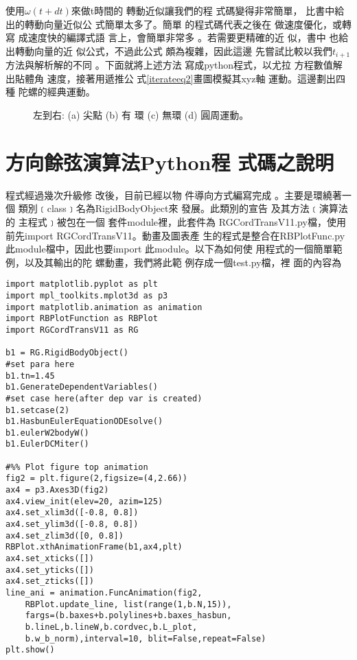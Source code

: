 \documentclass[12pt,twoside]{article}
\begin{document}
使用$\omega (t+dt)$來做t時間的%
轉動近似讓我們的程%
式碼變得非常簡單，%
比書中\cite[Page 301, Equation 10.24]{titterton}給%
出的轉動向量近似公%
式簡單太多了。簡單%
的程式碼代表之後在%
做速度優化，或轉寫%
成速度快的編譯式語%
言上，會簡單非常多%
。若需要更精確的近%
似，書\cite[Page 301, Equation 10.24]{titterton}中%
也給出轉動向量的近%
似公式，不過此公式%
頗為複雜，因此這邊%
先嘗試比較以我們$t_{i+1}$%
方法與解析解的不同%
。下面就將上述方法%
寫成python程式，以尤拉%
方程數值解出貼體角%
速度，接著用遞推公%
式\ref{iterateeq2}畫圖模擬其xyz軸%
運動。這邊劃出四種%
陀螺的經典運動。

\begin{figure}[th]
\caption{{}左到右: (a) 尖點 (b) 有%
環 (c) 無環 (d) 圓周運動。}
\label{FourClassics}
\begin{center}
\fbox{\scalebox{1.2}[1.2]{}}
\end{center}
\end{figure}

\part{方向餘弦演算法Python程%
式碼之說明}

程式經過幾次升級修%
改後，目前已經以物%
件導向方式編寫完成%
。主要是環繞著一個%
類別﹝class﹞名為RigidBodyObject來%
發展。此類別的宣告%
及其方法﹝演算法的%
主程式﹞被包在一個%
套件module裡，此套件為%
RGCordTransV11.py檔，使用前先import
RGCordTransV11。動畫及圖表產%
生的程式是整合在RBPlotFunc.py%
此module檔中，因此也要import%
此module。以下為如何使%
用程式的一個簡單範%
例，以及其輸出的陀%
螺動畫，我們將此範%
例存成一個test.py檔，裡%
面的內容為


\begin{listing}[H]
\begin{verbatim}
import matplotlib.pyplot as plt
import mpl_toolkits.mplot3d as p3
import matplotlib.animation as animation
import RBPlotFunction as RBPlot
import RGCordTransV11 as RG

b1 = RG.RigidBodyObject()
#set para here
b1.tn=1.45
b1.GenerateDependentVariables()
#set case here(after dep var is created)
b1.setcase(2)
b1.HasbunEulerEquationODEsolve()
b1.eulerW2bodyW()
b1.EulerDCMiter()

#%% Plot figure top animation
fig2 = plt.figure(2,figsize=(4,2.66))
ax4 = p3.Axes3D(fig2)
ax4.view_init(elev=20, azim=125)
ax4.set_xlim3d([-0.8, 0.8])
ax4.set_ylim3d([-0.8, 0.8])
ax4.set_zlim3d([0, 0.8])
RBPlot.xthAnimationFrame(b1,ax4,plt)
ax4.set_xticks([])
ax4.set_yticks([])
ax4.set_zticks([])
line_ani = animation.FuncAnimation(fig2, 
    RBPlot.update_line, list(range(1,b.N,15)), 
    fargs=(b.baxes+b.polylines+b.baxes_hasbun,
    b.lineL,b.lineW,b.cordvec,b.L_plot,
    b.w_b_norm),interval=10, blit=False,repeat=False)
plt.show()
\end{verbatim}

\label{運行陀螺動畫的一個程式範例}
\end{listing}
\end{document}
